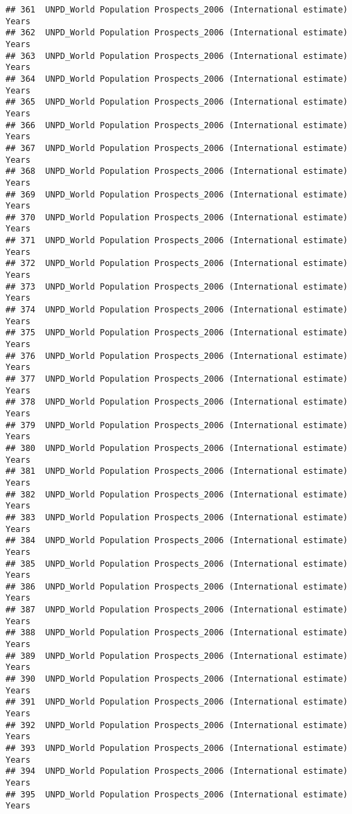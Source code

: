 \documentclass[]{article}
\begin{document}
\begin{verbatim}
## 361  UNPD_World Population Prospects_2006 (International estimate) Years
## 362  UNPD_World Population Prospects_2006 (International estimate) Years
## 363  UNPD_World Population Prospects_2006 (International estimate) Years
## 364  UNPD_World Population Prospects_2006 (International estimate) Years
## 365  UNPD_World Population Prospects_2006 (International estimate) Years
## 366  UNPD_World Population Prospects_2006 (International estimate) Years
## 367  UNPD_World Population Prospects_2006 (International estimate) Years
## 368  UNPD_World Population Prospects_2006 (International estimate) Years
## 369  UNPD_World Population Prospects_2006 (International estimate) Years
## 370  UNPD_World Population Prospects_2006 (International estimate) Years
## 371  UNPD_World Population Prospects_2006 (International estimate) Years
## 372  UNPD_World Population Prospects_2006 (International estimate) Years
## 373  UNPD_World Population Prospects_2006 (International estimate) Years
## 374  UNPD_World Population Prospects_2006 (International estimate) Years
## 375  UNPD_World Population Prospects_2006 (International estimate) Years
## 376  UNPD_World Population Prospects_2006 (International estimate) Years
## 377  UNPD_World Population Prospects_2006 (International estimate) Years
## 378  UNPD_World Population Prospects_2006 (International estimate) Years
## 379  UNPD_World Population Prospects_2006 (International estimate) Years
## 380  UNPD_World Population Prospects_2006 (International estimate) Years
## 381  UNPD_World Population Prospects_2006 (International estimate) Years
## 382  UNPD_World Population Prospects_2006 (International estimate) Years
## 383  UNPD_World Population Prospects_2006 (International estimate) Years
## 384  UNPD_World Population Prospects_2006 (International estimate) Years
## 385  UNPD_World Population Prospects_2006 (International estimate) Years
## 386  UNPD_World Population Prospects_2006 (International estimate) Years
## 387  UNPD_World Population Prospects_2006 (International estimate) Years
## 388  UNPD_World Population Prospects_2006 (International estimate) Years
## 389  UNPD_World Population Prospects_2006 (International estimate) Years
## 390  UNPD_World Population Prospects_2006 (International estimate) Years
## 391  UNPD_World Population Prospects_2006 (International estimate) Years
## 392  UNPD_World Population Prospects_2006 (International estimate) Years
## 393  UNPD_World Population Prospects_2006 (International estimate) Years
## 394  UNPD_World Population Prospects_2006 (International estimate) Years
## 395  UNPD_World Population Prospects_2006 (International estimate) Years

\end{verbatim}
\end{document}
